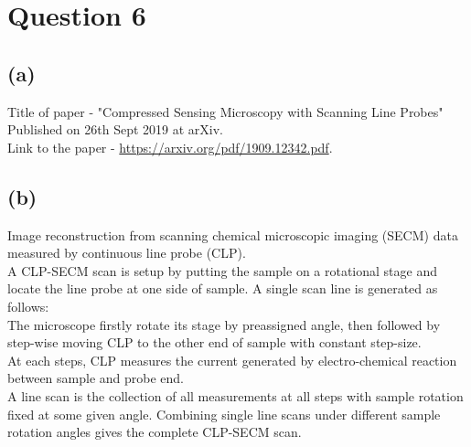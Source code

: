 \documentclass[fleqn, 11pt]{article}
\begin{document}
\newpage
\section*{Question 6}
\setcounter{equation}{0}

\subsection*{(a)}
Title of paper - "Compressed Sensing Microscopy with Scanning Line Probes" \\
Published on 26th Sept 2019 at arXiv. \\
Link to the paper - \url{https://arxiv.org/pdf/1909.12342.pdf}.


\subsection*{(b)}
Image reconstruction from scanning chemical microscopic imaging (SECM) data measured by continuous line probe (CLP). \\
A CLP-SECM scan is setup by putting the sample on a rotational stage and locate the line probe at one side of sample. A single scan line is generated as follows: \\
The microscope firstly rotate its stage by preassigned angle, then followed by step-wise moving CLP to the other end of sample with constant step-size. \\
At each steps, CLP measures the current generated by electro-chemical reaction between sample and probe end.\\
A line scan is the collection of all measurements at all steps with sample rotation fixed at some given angle. Combining single line scans under different sample rotation angles gives the complete CLP-SECM scan.\\
\end{document}
